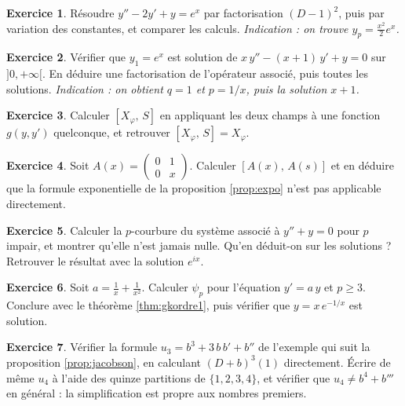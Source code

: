 \documentclass[11pt,a4paper]{article}
\theoremstyle{plain}
\theoremstyle{definition}
\newtheorem{exercice}{Exercice}
\theoremstyle{remark}
\newcommand{\Dx}{D}
\newcommand{\cro}[2]{\left[#1,\,#2\right]}
\begin{document}
\begin{exercice}
Résoudre $y'' - 2y' + y = e^{x}$ par factorisation $(\Dx-1)^2$, puis par variation des constantes, et comparer les calculs. \emph{Indication : on trouve $y_p = \frac{x^2}{2}e^{x}$.}
\end{exercice}

\begin{exercice}
Vérifier que $y_1 = e^{x}$ est solution de $x\,y'' - (x+1)\,y' + y = 0$ sur $]0,+\infty[$. En déduire une factorisation de l'opérateur associé, puis toutes les solutions. \emph{Indication : on obtient $q=1$ et $p = 1/x$, puis la solution $x+1$.}
\end{exercice}

\begin{exercice}
Calculer $\cro{X_\varphi}{S}$ en appliquant les deux champs à une fonction $g(y,y')$ quelconque, et retrouver $\cro{X_\varphi}{S} = X_\varphi$.
\end{exercice}

\begin{exercice}
Soit $A(x) = \begin{pmatrix} 0 & 1 \\ 0 & x \end{pmatrix}$. Calculer $\cro{A(x)}{A(s)}$ et en déduire que la formule exponentielle de la proposition \ref{prop:expo} n'est pas applicable directement.
\end{exercice}

\begin{exercice}
Calculer la $p$-courbure du système associé à $y'' + y = 0$ pour $p$ impair, et montrer qu'elle n'est jamais nulle. Qu'en déduit-on sur les solutions ? Retrouver le résultat avec la solution $e^{ix}$.
\end{exercice}

\begin{exercice}
Soit $a = \frac1x + \frac1{x^2}$. Calculer $\psi_p$ pour l'équation $y' = a\,y$ et $p \geq 3$. Conclure avec le théorème \ref{thm:gkordre1}, puis vérifier que $y = x\,e^{-1/x}$ est solution.
\end{exercice}

\begin{exercice}
Vérifier la formule $u_3 = b^3 + 3\,b\,b' + b''$ de l'exemple qui suit la proposition \ref{prop:jacobson}, en calculant $(\Dx + b)^3(1)$ directement. Écrire de même $u_4$ à l'aide des quinze partitions de $\{1,2,3,4\}$, et vérifier que $u_4 \neq b^4 + b'''$ en général : la simplification est propre aux nombres premiers.
\end{exercice}
\end{document}
